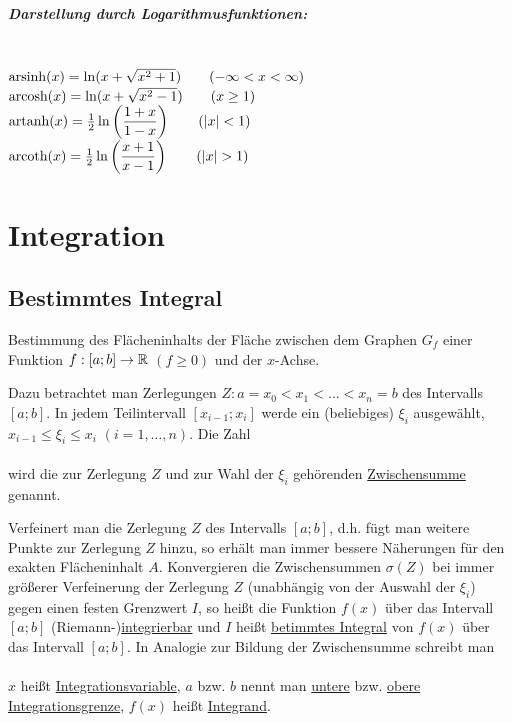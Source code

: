 \clearpage
\paragraph{Darstellung durch Logarithmusfunktionen:}\quad\\
$\mathbin\text{arsinh}(x)=\ln(x+\sqrt{x^2+1})\qquad(-\infty<x<\infty)$\\
$\mathbin\text{arcosh}(x)=\ln(x+\sqrt{x^2-1})\qquad(x\ge1)$\\
$\mathbin\text{artanh}(x)=\frac{1}{2}\ln\left(\dfrac{1+x}{1-x}\right)\qquad(|x|<1)$\\
$\arcoth(x)=\frac{1}{2}\ln\left(\dfrac{x+1}{x-1}\right)\qquad(|x|>1)$


\chapter{Integration}
\section{Bestimmtes Integral}
\Problem Bestimmung des Flächeninhalts der Fläche zwischen dem Graphen $G_f$ einer Funktion $f:[a;b]\to\mathbb{R}$ $(f\ge0)$ und der $x$-Achse.

Dazu betrachtet man Zerlegungen $Z:a=x_0<x_1<\ldots<x_n=b$ des Intervalls $[a;b]$. In jedem Teilintervall $[x_{i-1};x_i]$ werde ein (beliebiges) $\xi_i$ ausgewählt, $x_{i-1}\le\xi_i\le x_i$ $(i=1,\ldots,n)$. Die Zahl\\
\\
wird die zur Zerlegung $Z$ und zur Wahl der $\xi_i$ gehörenden \ul{Zwischensumme} genannt.


Verfeinert man die Zerlegung $Z$ des Intervalls $[a;b]$, d.h. fügt man weitere Punkte zur Zerlegung $Z$ hinzu, so erhält man immer bessere Näherungen für den exakten Flächeninhalt $A$. Konvergieren die Zwischensummen $\sigma(Z)$ bei immer größerer Verfeinerung der Zerlegung $Z$ (unabhängig von der Auswahl der $\xi_i$) gegen einen festen Grenzwert $I$, so heißt die Funktion $f(x)$ über das Intervall $[a;b]$ (Riemann-)\ul{integrierbar} und $I$ heißt \ul{betimmtes Integral} von $f(x)$ über das Intervall $[a;b]$. In Analogie zur Bildung der Zwischensumme schreibt man\\
\\
$x$ heißt \ul{Integrationsvariable}, $a$ bzw. $b$ nennt man \ul{untere} bzw. \ul{obere} \ul{Integrationsgrenze}, $f(x)$ heißt \ul{Integrand}.

